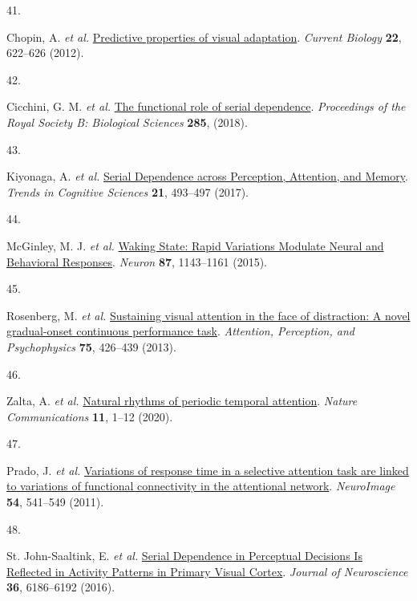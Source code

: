 \documentclass[
]{article}
\newlength{\cslhangindent}
\newlength{\csllabelwidth}
\newlength{\cslentryspacingunit} %
\newenvironment{CSLReferences}[2] %
 {%
  \setlength{\parindent}{0pt}
  \ifodd #1
  \let\oldpar\par
  \def\par{\hangindent=\cslhangindent\oldpar}
  \fi
  \setlength{\parskip}{#2\cslentryspacingunit}
 }%
 {}
\newcommand{\CSLLeftMargin}[1]{\parbox[t]{\csllabelwidth}{#1}}
\newcommand{\CSLRightInline}[1]{\parbox[t]{\linewidth - \csllabelwidth}{#1}\break}
\begin{document}
\begin{CSLReferences}{0}{0}
\leavevmode{}%
\CSLLeftMargin{41. }%
\CSLRightInline{Chopin, A. \emph{et al.}
\href{https://doi.org/10.1016/j.cub.2012.02.021}{{Predictive properties
of visual adaptation}}. \emph{Current Biology} \textbf{22}, 622--626
(2012).}

\leavevmode{}%
\CSLLeftMargin{42. }%
\CSLRightInline{Cicchini, G. M. \emph{et al.}
\href{https://doi.org/10.1098/rspb.2018.1722}{{The functional role of
serial dependence}}. \emph{Proceedings of the Royal Society B:
Biological Sciences} \textbf{285}, (2018).}

\leavevmode{}%
\CSLLeftMargin{43. }%
\CSLRightInline{Kiyonaga, A. \emph{et al.}
\href{https://doi.org/10.1016/j.tics.2017.04.011}{{Serial Dependence
across Perception, Attention, and Memory}}. \emph{Trends in Cognitive
Sciences} \textbf{21}, 493--497 (2017).}

\leavevmode{}%
\CSLLeftMargin{44. }%
\CSLRightInline{McGinley, M. J. \emph{et al.}
\href{https://doi.org/10.1016/j.neuron.2015.09.012}{{Waking State: Rapid
Variations Modulate Neural and Behavioral Responses}}. \emph{Neuron}
\textbf{87}, 1143--1161 (2015).}

\leavevmode{}%
\CSLLeftMargin{45. }%
\CSLRightInline{Rosenberg, M. \emph{et al.}
\href{https://doi.org/10.3758/s13414-012-0413-x}{{Sustaining visual
attention in the face of distraction: A novel gradual-onset continuous
performance task}}. \emph{Attention, Perception, and Psychophysics}
\textbf{75}, 426--439 (2013).}

\leavevmode{}%
\CSLLeftMargin{46. }%
\CSLRightInline{Zalta, A. \emph{et al.}
\href{https://doi.org/10.1038/s41467-020-14888-8}{{Natural rhythms of
periodic temporal attention}}. \emph{Nature Communications} \textbf{11},
1--12 (2020).}

\leavevmode{}%
\CSLLeftMargin{47. }%
\CSLRightInline{Prado, J. \emph{et al.}
\href{https://doi.org/10.1016/j.neuroimage.2010.08.022}{{Variations of
response time in a selective attention task are linked to variations of
functional connectivity in the attentional network}}. \emph{NeuroImage}
\textbf{54}, 541--549 (2011).}

\leavevmode{}%
\CSLLeftMargin{48. }%
\CSLRightInline{St. John-Saaltink, E. \emph{et al.}
\href{https://doi.org/10.1523/JNEUROSCI.4390-15.2016}{{Serial Dependence
in Perceptual Decisions Is Reflected in Activity Patterns in Primary
Visual Cortex}}. \emph{Journal of Neuroscience} \textbf{36}, 6186--6192
(2016).}


\end{CSLReferences}
\end{document}
